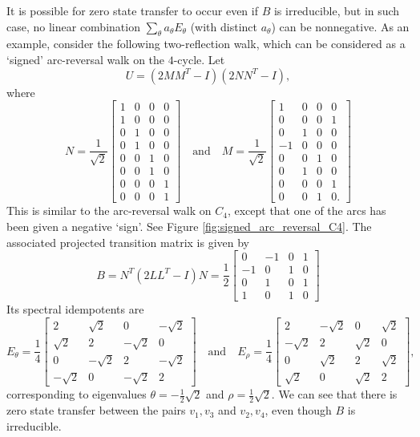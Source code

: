 \documentclass{article}
\numberwithin{equation}{section}
\begin{document}
It is possible for zero state transfer to occur even if $B$ is irreducible, but in such case, no linear combination $\sum_\theta a_\theta E_\theta$ (with distinct $a_\theta$) can be nonnegative. As an example, consider the following two-reflection walk, which can be considered as a `signed' arc-reversal walk on the $4$-cycle. Let
\[
U = (2MM^T - I)(2NN^T - I),
\]
where
\[
N = \frac{1}{\sqrt{2}}\begin{bmatrix}
1 & 0 & 0 & 0 \\
1 & 0 & 0 & 0 \\
0 & 1 & 0 & 0 \\
0 & 1 & 0 & 0 \\
0 & 0 & 1 & 0 \\
0 & 0 & 1 & 0 \\
0 & 0 & 0 & 1 \\
0 & 0 & 0 & 1
\end{bmatrix}
\quad \text{and} \quad
M =
\frac{1}{\sqrt{2}}
\begin{bmatrix}
1 & 0 & 0 & 0 \\
0 & 0 & 0 & 1 \\
0 & 1 & 0 & 0 \\
-1 & 0 & 0 & 0 \\
0 & 0 & 1 & 0 \\
0 & 1 & 0 & 0 \\
0 & 0 & 0 & 1 \\
0 & 0 & 1 & 0.
\end{bmatrix}
\]
This is similar to the arc-reversal walk on $C_4$, except that one of the arcs has been given a negative `sign'. See Figure \ref{fig:signed_arc_reversal_C4}. The associated projected transition matrix is given by
\[
B = N^T (2LL^T - I)N = \frac{1}{2}\begin{bmatrix}
0 & -1 & 0 & 1 \\
-1 & 0 & 1 & 0 \\
0 & 1 & 0 & 1 \\
1 & 0 & 1 & 0
\end{bmatrix}
\]
Its spectral idempotents are
\[
E_{\theta} = \frac{1}{4}\begin{bmatrix}
2 & \sqrt{2} & 0 & -\sqrt{2} \\
\sqrt{2} & 2 & -\sqrt{2} & 0 \\
0 & -\sqrt{2} & 2 & -\sqrt{2} \\
-\sqrt{2} & 0 & -\sqrt{2} & 2
\end{bmatrix} \quad \text{and} \quad E_\rho = \frac{1}{4}\begin{bmatrix}
2 & -\sqrt{2} & 0 & \sqrt{2} \\
-\sqrt{2} & 2 & \sqrt{2} & 0 \\
0 & \sqrt{2} & 2 & \sqrt{2} \\
\sqrt{2} & 0 & \sqrt{2} & 2
\end{bmatrix},
\]
corresponding to eigenvalues $\theta = -\frac{1}{2}\sqrt{2}$ and $\rho = \frac{1}{2}\sqrt{2}$. We can see that there is zero state transfer between the pairs $v_1,v_3$ and $v_2,v_4$, even though $B$ is irreducible.
\end{document}
